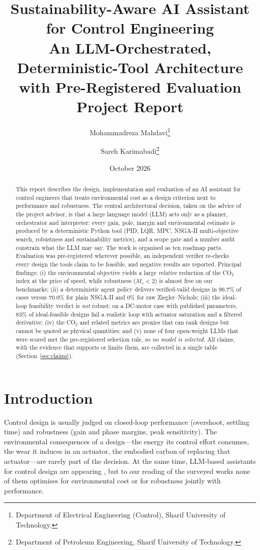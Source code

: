 \documentclass[a4paper,11pt]{article}
\title{\textbf{Sustainability-Aware AI Assistant for Control Engineering}\\[4pt]
\large An LLM-Orchestrated, Deterministic-Tool Architecture\\ with Pre-Registered Evaluation\\[6pt]
\normalsize Project Report}
\author{Mohammadreza Mahdavi\thanks{Department of Electrical Engineering (Control), Sharif University of Technology.}
\and Sareh Karimabadi\thanks{Department of Petroleum Engineering, Sharif University of Technology.}}
\date{October 2026}
\begin{document}
\maketitle
\thispagestyle{fancy}

\begin{abstract}
\noindent
This report describes the design, implementation and evaluation of an AI assistant for control engineers that treats environmental cost as a design criterion next to performance and robustness.
The central architectural decision, taken on the advice of the project advisor, is that a large language model (LLM) acts only as a planner, orchestrator and interpreter: every gain, pole, margin and environmental estimate is produced by a deterministic Python tool (PID, LQR, MPC, NSGA-II multi-objective search, robustness and sustainability metrics), and a scope gate and a number audit constrain what the LLM may say.
The work is organised as ten roadmap parts. Evaluation was pre-registered wherever possible, an independent verifier re-checks every design the tools claim to be feasible, and negative results are reported.
Principal findings: (i) the environmental objective yields a large \emph{relative} reduction of the CO$_2$ index at the price of speed, while robustness ($M_s<2$) is almost free on our benchmarks; (ii) a deterministic agent policy delivers verified-valid designs in 96.7\% of cases versus 70.0\% for plain NSGA-II and 0\% for raw Ziegler--Nichols; (iii) the ideal-loop feasibility verdict is \emph{not} robust: on a DC-motor case with published parameters, 83\% of ideal-feasible designs fail a realistic loop with actuator saturation and a filtered derivative; (iv) the CO$_2$ and related metrics are proxies that can rank designs but cannot be quoted as physical quantities; and (v) none of four open-weight LLMs that were scored met the pre-registered selection rule, so \emph{no model is selected}.
All claims, with the evidence that supports or limits them, are collected in a single table (Section~\ref{sec:claims}).
\end{abstract}

\tableofcontents
\newpage

\section{Introduction}
Control design is usually judged on closed-loop performance (overshoot, settling time) and robustness (gain and phase margins, peak sensitivity). The environmental consequences of a design---the energy its control effort consumes, the wear it induces in an actuator, the embodied carbon of replacing that actuator---are rarely part of the decision. At the same time, LLM-based assistants for control design are appearing \cite{controlagent,agenticcontrol,smartcontrol,llmpid}, but to our reading of the surveyed works none of them optimises for environmental cost or for robustness jointly with performance.
\end{document}
